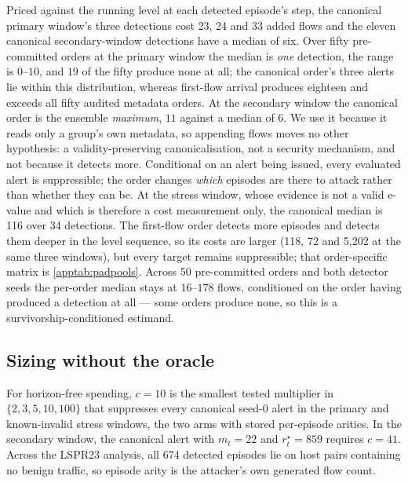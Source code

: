 \documentclass[conference]{IEEEtran}
\begin{document}
Priced against the running level at each detected episode's step, the canonical primary window's three
detections cost 23, 24 and 33 added flows and the eleven canonical secondary-window detections have a
median of six. Over fifty pre-committed orders at the primary window the median is \emph{one}
detection, the range is $0$--$10$, and $19$ of the fifty produce none at all; the canonical order's three
alerts lie within this distribution, whereas first-flow arrival produces eighteen and exceeds all fifty
audited metadata orders. At the secondary window the canonical order is the ensemble \emph{maximum},
$11$ against a median of $6$. We use it because it reads only a group's own metadata, so appending flows
moves no other hypothesis: a validity-preserving canonicalisation, not a security mechanism, and not
because it detects more. Conditional on an alert being issued, every evaluated alert is suppressible;
the order changes \emph{which} episodes are there to attack rather than whether they can be. At the
stress window, whose evidence is not a valid e-value and which is therefore a cost measurement only, the
canonical median is 116 over 34 detections. The first-flow order detects more
episodes and detects them deeper in the level sequence, so its costs are larger (118, 72 and 5,202 at
the same three windows), but every target remains suppressible; that order-specific matrix is
\cref{apptab:padpools}. Across 50 pre-committed orders and both detector seeds the per-order median
stays at $16$--$178$ flows, conditioned on the order having produced a detection at all --- some orders
produce none, so this is a survivorship-conditioned estimand.

\subsection{Sizing without the oracle}\label{app:nonoracle}

For horizon-free spending, $c=10$ is the smallest tested multiplier in $\{2,3,5,10,100\}$
that suppresses every canonical seed-0 alert in the primary and known-invalid stress windows,
the two arms with stored per-episode arities. In the secondary window, the canonical alert with
$m_t=22$ and $r^\star_t=859$ requires $c=41$. Across the LSPR23 analysis, all 674 detected
episodes lie on host pairs containing no benign traffic, so episode arity is the attacker's
own generated flow count.
\end{document}
